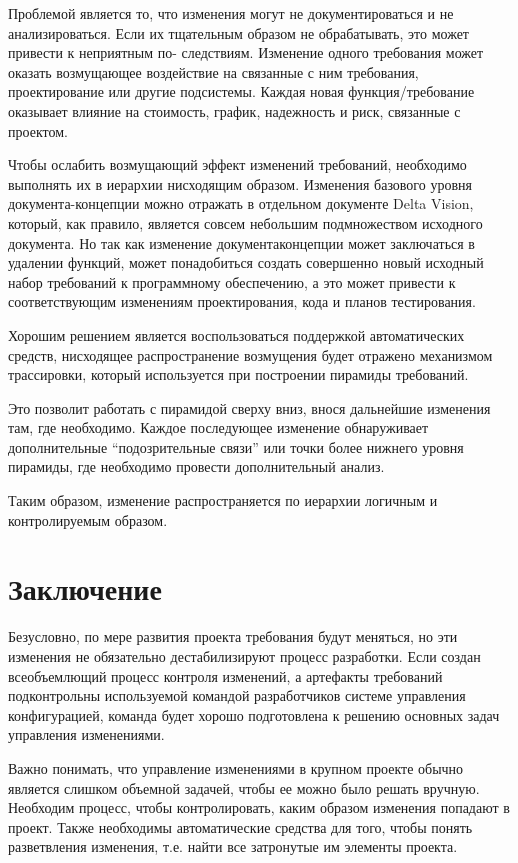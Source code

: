 \documentclass[a4paper,14pt]{extarticle}
\begin{document}
Проблемой является то, что изменения могут не документироваться и не
анализироваться. Если их тщательным образом не обрабатывать, это может привести
к неприятным по- следствиям. Изменение одного требования может оказать
возмущающее воздействие на связанные с ним требования, проектирование или другие
подсистемы. Каждая новая функция/требование оказывает влияние на стоимость,
график, надежность и риск, связанные с проектом.

Чтобы ослабить возмущающий эффект изменений требований, необходимо выполнять их
в иерархии нисходящим образом. Изменения базового уровня документа-концепции
можно отражать в отдельном документе Delta Vision, который, как правило,
является совсем небольшим подмножеством исходного документа. Но так как
изменение документаконцепции может заключаться в удалении функций, может
понадобиться создать совершенно новый исходный набор требований к программному
обеспечению, а это может привести к соответствующим изменениям проектирования,
кода и планов тестирования.

Хорошим решением является воспользоваться поддержкой автоматических средств,
нисходящее распространение возмущения будет отражено механизмом трассировки,
который используется при построении пирамиды требований.

Это позволит работать с пирамидой сверху вниз, внося дальнейшие изменения там,
где необходимо. Каждое последующее изменение обнаруживает дополнительные
\enquote{подозрительные связи} или точки более нижнего уровня пирамиды, где необходимо
провести дополнительный анализ.

Таким образом, изменение распространяется по иерархии логичным и контролируемым
образом.
\pagebreak

\section*{Заключение}

Безусловно, по мере развития проекта требования будут меняться, но эти изменения
не обязательно дестабилизируют процесс разработки. Если создан всеобъемлющий
процесс контроля изменений, а артефакты требований подконтрольны используемой
командой разработчиков системе управления конфигурацией, команда будет хорошо
подготовлена к решению основных задач управления изменениями.

Важно понимать, что управление изменениями в крупном проекте обычно является
слишком объемной задачей, чтобы ее можно было решать вручную. Необходим процесс,
чтобы контролировать, каким образом изменения попадают в проект. Также
необходимы автоматические средства для того, чтобы понять разветвления
изменения, т.е. найти все затронутые им элементы проекта.
\pagebreak
\end{document}
